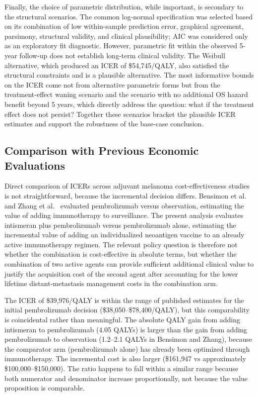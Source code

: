 \documentclass[12pt,a4paper]{article}
\begin{document}
Finally, the choice of parametric distribution, while important, is secondary to the structural scenarios. The common log-normal specification was selected based on its combination of low within-sample prediction error, graphical agreement, parsimony, structural validity, and clinical plausibility; AIC was considered only as an exploratory fit diagnostic. However, parametric fit within the observed 5-year follow-up does not establish long-term clinical validity. The Weibull alternative, which produced an ICER of \$54,745/QALY, also satisfied the structural constraints and is a plausible alternative. The most informative bounds on the ICER come not from alternative parametric forms but from the treatment-effect waning scenario and the scenario with no additional OS hazard benefit beyond 5 years, which directly address the question: what if the treatment effect does not persist? Together these scenarios bracket the plausible ICER estimates and support the robustness of the base-case conclusion.\subsection{Comparison with Previous Economic Evaluations}

Direct comparison of ICERs across adjuvant melanoma cost-effectiveness studies is not straightforward, because the incremental decision differs. Bensimon et al.\ \cite{bensimon2019} and Zhang et al.\ \cite{zhang2023} evaluated \mbox{pembrolizumab} versus observation, estimating the value of adding immunotherapy to surveillance. The present analysis evaluates intismeran plus \mbox{pembrolizumab} versus \mbox{pembrolizumab} alone, estimating the incremental value of adding an individualized neoantigen vaccine to an already active immunotherapy regimen. The relevant policy question is therefore not whether the combination is cost-effective in absolute terms, but whether the combination of two active agents can provide sufficient additional clinical value to justify the acquisition cost of the second agent after accounting for the lower lifetime distant-metastasis management costs in the combination arm.

The ICER of \$39,976/QALY is within the range of published estimates for the initial \mbox{pembrolizumab} decision (\$38,050--\$78,400/QALY), but this comparability is coincidental rather than meaningful. The absolute QALY gain from adding intismeran to \mbox{pembrolizumab} (4.05 QALYs) is larger than the gain from adding \mbox{pembrolizumab} to observation (1.2--2.1 QALYs in Bensimon and Zhang), because the comparator arm (\mbox{pembrolizumab} alone) has already been optimized through immunotherapy. The incremental cost is also larger (\$161,947 vs approximately \$100,000--\$150,000). The ratio happens to fall within a similar range because both numerator and denominator increase proportionally, not because the value proposition is comparable.
\end{document}
